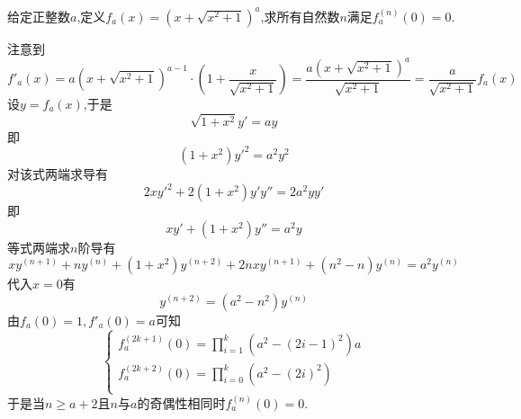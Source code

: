 \documentclass{ctexart}
\begin{document}
\begin{problem}[9.(8\songti{分})]
    给定正整数$a$,定义$f_a(x)=\left(x+\sqrt{x^2+1}\right)^a$,求所有自然数$n$满足$f_a^{(n)}(0)=0$.
\end{problem}
\begin{solution}[Solution.]
    注意到$$f'_a(x)=a\left(x+\sqrt{x^2+1}\right)^{a-1}\cdot\left(1+\dfrac{x}{\sqrt{x^2+1}}\right)=\dfrac{a\left(x+\sqrt{x^2+1}\right)^a}{\sqrt{x^2+1}}=\dfrac{a}{\sqrt{x^2+1}}f_a(x)$$
    设$y=f_a(x)$,于是$$\sqrt{1+x^2}y'=ay$$
    即$$\left(1+x^2\right)y'^2=a^2y^2$$
    对该式两端求导有$$2xy'^2+2\left(1+x^2\right)y'y''=2a^2yy'$$
    即$$xy'+\left(1+x^2\right)y''=a^2y$$
    等式两端求$n$阶导有$$xy^{(n+1)}+ny^{(n)}+\left(1+x^2\right)y^{(n+2)}+2nxy^{(n+1)}+\left(n^2-n\right)y^{(n)}=a^2y^{(n)}$$
    代入$x=0$有$$y^{(n+2)}=\left(a^2-n^2\right)y^{(n)}$$
    由$f_a(0)=1,f'_a(0)=a$可知
    $$\left\{\begin{array}{l}
        f_a^{(2k+1)}(0)=\prod_{i=1}^{k}\left(a^2-\left(2i-1\right)^2\right)a \\
        f_a^{(2k+2)}(0)=\prod_{i=0}^{k}\left(a^2-\left(2i\right)^2\right) \\
    \end{array}\right.$$
    于是当$n\geqslant a+2$且$n$与$a$的奇偶性相同时$f_a^{(n)}(0)=0$.
\end{solution}
\end{document}
